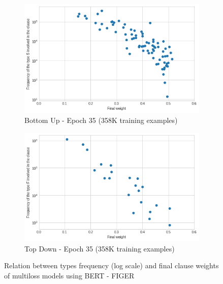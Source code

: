 \begin{figure}[bth]
     \centering
     \begin{subfigure}[b]{0.7\textwidth}
         \centering
         \includegraphics[width=\textwidth]{figures/weight_freq_bert_figer_bu_multiloss.png}
         \caption{Bottom Up - Epoch 35 (358K training examples)}
         \label{fig:weight_freq_bert_figer_bu_multiloss}
         \vspace{10px}
     \end{subfigure}
     \begin{subfigure}[b]{0.7\textwidth}
         \centering
         \includegraphics[width=\textwidth]{figures/weight_freq_bert_figer_td_multiloss.png}
         \caption{Top Down - Epoch 35 (358K training examples)}
         \label{fig:weight_freq_bert_figer_td_multiloss}
     \end{subfigure}
    \caption{Relation between types frequency (log scale) and final clause weights of multiloss models using BERT - FIGER}
    \label{fig:weight_freq_bert_figer}
\end{figure}

